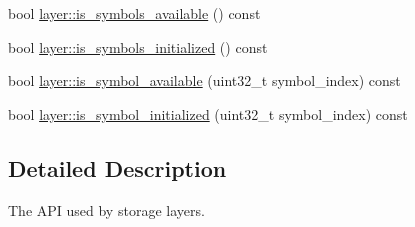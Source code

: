 \begin{DoxyCompactItemize}
bool \hyperlink{group__storage__api_ga5ae117017003f56eefe58371347598ec}{layer\-::is\-\_\-symbols\-\_\-available} () const 
\item 
bool \hyperlink{group__storage__api_ga134051aecd385adf8ff559ef1e9bf087}{layer\-::is\-\_\-symbols\-\_\-initialized} () const 
\item 
bool \hyperlink{group__storage__api_ga0159acc59a71f6e3fb0d1c2af289bb23}{layer\-::is\-\_\-symbol\-\_\-available} (uint32\-\_\-t symbol\-\_\-index) const 
\item 
bool \hyperlink{group__storage__api_ga853c0ecb0f991f97a94fd92ee2591912}{layer\-::is\-\_\-symbol\-\_\-initialized} (uint32\-\_\-t symbol\-\_\-index) const 
\end{DoxyCompactItemize}


\subsection{Detailed Description}
The A\-P\-I used by storage layers. 

